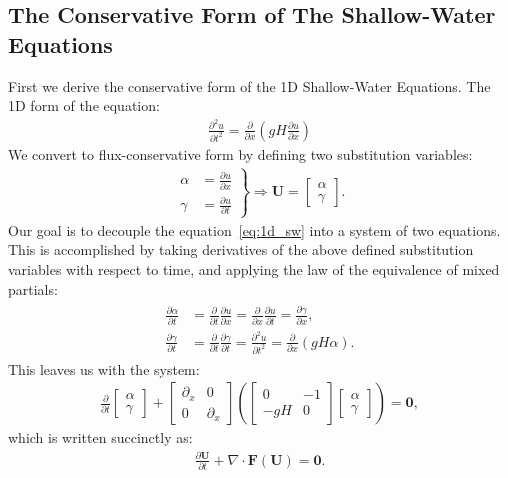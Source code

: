 \documentclass[../main.tex]{subfiles}
\begin{document}
\subsection{The Conservative Form of The Shallow-Water Equations}
First we derive the conservative form of the 1D Shallow-Water Equations. The 1D form of the equation:
\begin{gather}\label{eq:1d_sw}
	\frac{\partial^2 u}{\partial t^2} = \frac{\partial }{\partial x}\left( gH\frac{\partial u}{\partial x}\right)
\end{gather}
We convert to flux-conservative form by defining two substitution variables:
\begin{gather*}
	\left.
	\begin{aligned}
		\alpha &= \frac{\partial u}{\partial x}\\
		\gamma &= \frac{\partial u}{\partial t}
	\end{aligned}
	\right\}
	\Rightarrow
	\mathbf{U} = \begin{bmatrix}\alpha \\ \gamma \end{bmatrix}.
\end{gather*}
Our goal is to decouple the equation~\ref{eq:1d_sw} into a system of two equations. This is accomplished by taking derivatives of the above defined substitution variables with respect to time, and applying the law of the equivalence of mixed partials:
\begin{gather*}
	\begin{aligned}
		\frac{\partial \alpha}{\partial t} &= \frac{\partial}{\partial t}\frac{\partial u}{\partial x} = \frac{\partial}{\partial x}\frac{\partial u}{\partial t}=\frac{\partial \gamma}{\partial x},\\
		\frac{\partial \gamma}{\partial t} &=\frac{\partial}{\partial t}\frac{\partial \gamma}{\partial t}=\frac{\partial^2 u}{\partial t^2}=\frac{\partial }{\partial x}\left( gH\alpha\right).
	\end{aligned}
\end{gather*}
This leaves us with the system:
\begin{gather*}
	\frac{\partial }{\partial t}
	\begin{bmatrix}
		\alpha \\ \gamma
	\end{bmatrix}
	+
	\begin{bmatrix}
		\partial_x & 0\\
		0 & \partial_x 
	\end{bmatrix}
	\left(
	\begin{bmatrix}
		0 & -1\\
		-gH & 0
	\end{bmatrix}
	\begin{bmatrix}
		\alpha \\
		\gamma
	\end{bmatrix}
	\right)
	=
	\mathbf{0},
\end{gather*}
which is written succinctly as:
\begin{gather*}
	\frac{\partial \mathbf{U}}{\partial t} + \nabla\cdot\mathbf{F}(\mathbf{U}) = \mathbf{0}.
\end{gather*}
\end{document}
